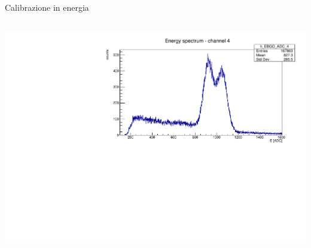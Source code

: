 \documentclass [xcolor=svgnames] {beamer}
\begin{document}
\begin{frame}{Calibrazione in energia}
\begin{columns}
{			\includegraphics[width=\linewidth]{img/ex1777.pdf}}
	\end{columns}
\end{frame}




\end{document}
